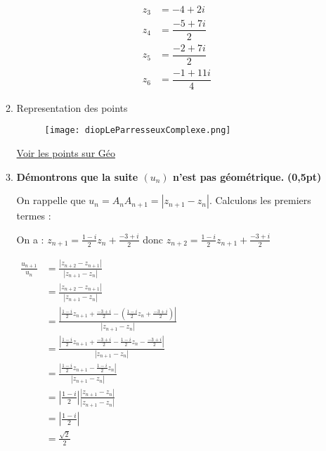 \documentclass[12pt,a4paper]{article}
\begin{document}
\begin{enumerate}
\begin{enumerate}
 \begin{resultbox}
\[
\boxed{
\begin{aligned}
z_3 &= -4 + 2i \\
z_4 &= \dfrac{-5 + 7i}{2} \\
z_5 &= \dfrac{-2 + 7i}{2} \\
z_6 &= \dfrac{-1 + 11i}{4}
\end{aligned}
}
\]
\end{resultbox}
\item Representation des points\\

\begin{center}
        \begin{figure}[H]%
         \centering
         \texttt{[image: diopLeParresseuxComplexe.png]}
        \end{figure}
    \end{center}
        \href{https://www.geogebra.org/classic/unkauraq}{Voir les points sur Géo}

\item \textbf{Démontrons que la suite \( (u_n) \) n’est pas géométrique.} \hfill \textbf{(0,5pt)}

On rappelle que \( u_n = A_nA_{n+1} = |z_{n+1} - z_n| \). Calculons les premiers termes :

On a : \( z_{n+1} = \frac{1 - i}{2}z_n + \frac{-3 + i}{2} \) donc \( z_{n+2} = \frac{1 - i}{2}z_{n+1} + \frac{-3 + i}{2} \)

\(
\begin{aligned}
    \frac{u_{n+1}}{u_n}&=\frac{|z_{n+2} - z_{n+1}|}{|z_{n+1} - z_n|}\\
                       &=\frac{|z_{n+2} - z_{n+1}|}{|z_{n+1} - z_n|}\\
                       &=\frac{|\frac{1 - i}{2}z_{n+1} + \frac{-3 + i}{2} - \left( \frac{1 - i}{2}z_n + \frac{-3 + i}{2} \right)|}{|z_{n+1} - z_n|}\\
                       &=\frac{|\frac{1 - i}{2}z_{n+1} + \frac{-3 + i}{2} - \frac{1 - i}{2}z_n - \frac{-3 + i}{2}|}{|z_{n+1} - z_n|}\\
                       &=\frac{|\frac{1 - i}{2}z_{n+1} - \frac{1 - i}{2}z_n|}{|z_{n+1} - z_n|}\\
                       &=\left|\frac{1 - i}{2}\right|\frac{\left|z_{n+1} - z_n\right|}{|z_{n+1} - z_n|}\\
                       &=\left|\frac{1 - i}{2}\right|\\
                       &=\frac{\sqrt{2}}{2}\\
\end{aligned}
\)


\end{enumerate}
\end{enumerate}
\end{document}
